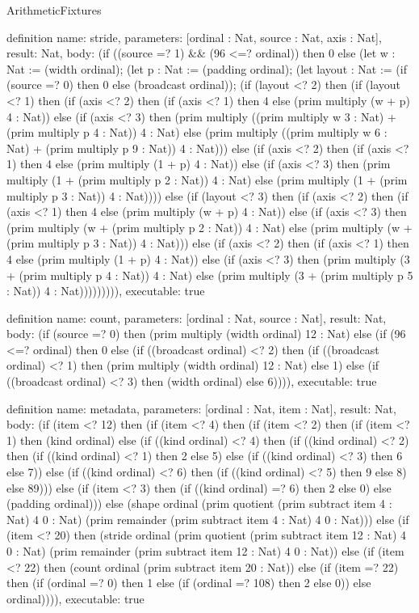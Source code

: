 \begin{lexlean}{ArithmeticFixtures}
\begin{semanticmodule}
definition{
  name: stride,
  parameters: [ordinal : Nat, source : Nat, axis : Nat],
  result: Nat,
  body: (if ((source =? 1) && (96 <=? ordinal)) then 0 else (let w : Nat := (width ordinal); (let p : Nat := (padding ordinal); (let layout : Nat := (if (source =? 0) then 0 else (broadcast ordinal)); (if (layout <? 2) then (if (layout <? 1) then (if (axis <? 2) then (if (axis <? 1) then 4 else (prim multiply (w + p) 4 : Nat)) else (if (axis <? 3) then (prim multiply ((prim multiply w 3 : Nat) + (prim multiply p 4 : Nat)) 4 : Nat) else (prim multiply ((prim multiply w 6 : Nat) + (prim multiply p 9 : Nat)) 4 : Nat))) else (if (axis <? 2) then (if (axis <? 1) then 4 else (prim multiply (1 + p) 4 : Nat)) else (if (axis <? 3) then (prim multiply (1 + (prim multiply p 2 : Nat)) 4 : Nat) else (prim multiply (1 + (prim multiply p 3 : Nat)) 4 : Nat)))) else (if (layout <? 3) then (if (axis <? 2) then (if (axis <? 1) then 4 else (prim multiply (w + p) 4 : Nat)) else (if (axis <? 3) then (prim multiply (w + (prim multiply p 2 : Nat)) 4 : Nat) else (prim multiply (w + (prim multiply p 3 : Nat)) 4 : Nat))) else (if (axis <? 2) then (if (axis <? 1) then 4 else (prim multiply (1 + p) 4 : Nat)) else (if (axis <? 3) then (prim multiply (3 + (prim multiply p 4 : Nat)) 4 : Nat) else (prim multiply (3 + (prim multiply p 5 : Nat)) 4 : Nat))))))))),
  executable: true
}

definition{
  name: count,
  parameters: [ordinal : Nat, source : Nat],
  result: Nat,
  body: (if (source =? 0) then (prim multiply (width ordinal) 12 : Nat) else (if (96 <=? ordinal) then 0 else (if ((broadcast ordinal) <? 2) then (if ((broadcast ordinal) <? 1) then (prim multiply (width ordinal) 12 : Nat) else 1) else (if ((broadcast ordinal) <? 3) then (width ordinal) else 6)))),
  executable: true
}

definition{
  name: metadata,
  parameters: [ordinal : Nat, item : Nat],
  result: Nat,
  body: (if (item <? 12) then (if (item <? 4) then (if (item <? 2) then (if (item <? 1) then (kind ordinal) else (if ((kind ordinal) <? 4) then (if ((kind ordinal) <? 2) then (if ((kind ordinal) <? 1) then 2 else 5) else (if ((kind ordinal) <? 3) then 6 else 7)) else (if ((kind ordinal) <? 6) then (if ((kind ordinal) <? 5) then 9 else 8) else 89))) else (if (item <? 3) then (if ((kind ordinal) =? 6) then 2 else 0) else (padding ordinal))) else (shape ordinal (prim quotient (prim subtract item 4 : Nat) 4 0 : Nat) (prim remainder (prim subtract item 4 : Nat) 4 0 : Nat))) else (if (item <? 20) then (stride ordinal (prim quotient (prim subtract item 12 : Nat) 4 0 : Nat) (prim remainder (prim subtract item 12 : Nat) 4 0 : Nat)) else (if (item <? 22) then (count ordinal (prim subtract item 20 : Nat)) else (if (item =? 22) then (if (ordinal =? 0) then 1 else (if (ordinal =? 108) then 2 else 0)) else ordinal)))),
  executable: true
}


\end{semanticmodule}
\end{lexlean}
